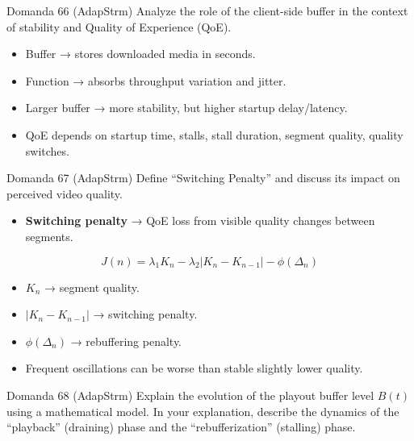 \begin{questionbox}{Domanda 66}
(AdapStrm) Analyze the role of the client-side buffer in the context of stability and Quality of Experience (QoE).
\end{questionbox}


\begin{itemize}
  \item Buffer → stores downloaded media in seconds.
  \item Function → absorbs throughput variation and jitter.
  \item Larger buffer → more stability, but higher startup delay/latency.
  \item QoE depends on startup time, stalls, stall duration, segment quality, quality switches.
\end{itemize}



\begin{questionbox}{Domanda 67}
(AdapStrm) Define “Switching Penalty” and discuss its impact on perceived video quality.
\end{questionbox}


\begin{itemize}
  \item \textbf{Switching penalty} → QoE loss from visible quality changes between segments.
\end{itemize}


$$
J(n)=\lambda_1K_n-\lambda_2|K_n-K_{n-1}|-\phi(\Delta_n)
$$


\begin{itemize}
  \item $K_n$ → segment quality.
  \item $|K_n-K_{n-1}|$ → switching penalty.
  \item $\phi(\Delta_n)$ → rebuffering penalty.
  \item Frequent oscillations can be worse than stable slightly lower quality.
\end{itemize}

\begin{tcolorbox}[colback=white, colframe=gray!50, height=4.5cm, sharp corners]
\end{tcolorbox}



\begin{questionbox}{Domanda 68}
(AdapStrm) Explain the evolution of the playout buffer level $B(t)$ using a mathematical model. In your explanation, describe the dynamics of the “playback” (draining) phase and the “rebufferization” (stalling) phase.
\end{questionbox}



